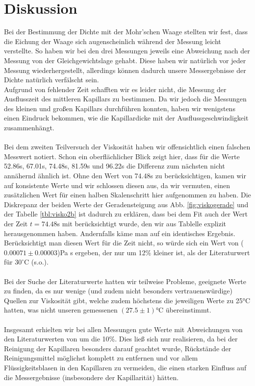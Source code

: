 \documentclass[12pt,a4paper,titlepage,headinclude,bibtotoc]{scrartcl}
\begin{document}
\section{Diskussion}
\label{sec:diskussion}
Bei der Bestimmung der Dichte mit der Mohr'schen Waage stellten wir fest, dass die Eichung der Waage sich augenscheinlich während der Messung leicht verstellte.
So haben wir bei den drei Messungen jeweils eine Abweichung nach der Messung von der Gleichgewichtslage gehabt.
Diese haben wir natürlich vor jeder Messung wiederhergestellt, allerdings können dadurch unsere Messergebnisse der Dichte natürlich verfälscht sein.\\
Aufgrund von fehlender Zeit schafften wir es leider nicht, die Messung der Ausflusszeit des mittleren Kapillars zu bestimmen.
Da wir jedoch die Messungen des kleinen und großen Kapillars durchführen konnten, haben wir wenigstens einen Eindruck bekommen, wie die Kapillardicke mit der Ausflussgeschwindigkeit zusammenhängt.\\\\
Bei dem zweiten Teilversuch der Viskosität haben wir offensichtlich einen falschen Messwert notiert.
Schon ein oberflächlicher Blick zeigt hier, dass für die Werte 52.86s, 67.01s, 74.48s, 81.59s und 96.22s die Differenz zum nächsten nicht annähernd ähnlich ist.
Ohne den Wert von 74.48s zu berücksichtigen, kamen wir auf konsistente Werte und wir schlossen diesen aus, da wir vermuten, einen zusätzlichen Wert für einen halben Skalenschritt hier aufgenommen zu haben.
Die Diskrepanz der beiden Werte der Geradensteigung aus Abb. \ref{fig:viskogerade} und der Tabelle \ref{tbl:visko2b} ist dadurch zu erklären, dass bei dem Fit auch der Wert der Zeit $t=74.48$s mit berücksichtigt wurde, den wir aus Tablelle explizit herausgenommen haben.
Andernfalls käme man auf ein identisches Ergebnis.
Berücksichtigt man diesen Wert für die Zeit nicht, so würde sich ein Wert von ($0.00071 \pm 0.00003$)Pa s ergeben, der nur um 12\% kleiner ist, als der Literaturwert für $30^\circ$C (s.o.).\\\\
Bei der Suche der Literaturwerte hatten wir teilweise Probleme, geeignete Werte zu finden, da es nur wenige (und zudem nicht besonders vertrauenswürdige) Quellen zur Viskosität gibt, welche zudem höchstens die jeweiligen Werte zu 25\si{\celsius} hatten, was nicht unseren gemessenen $(27.5\pm 1)$\si{\celsius} übereinstimmt.\\\\
Insgesamt erhielten wir bei allen Messungen gute Werte mit Abweichungen von den Literaturwerten von um die 10\%.
Dies ließ sich nur realisieren, da bei der Reinigung der Kapillaren besonders darauf geachtet wurde, Rückstände der Reinigungsmittel möglichst komplett zu entfernen und vor allem Flüssigkeitsblasen in den Kapillaren zu vermeiden, die einen starken Einfluss auf die Messergebnisse (insbesondere der Kapillarität) hätten.
\end{document}

